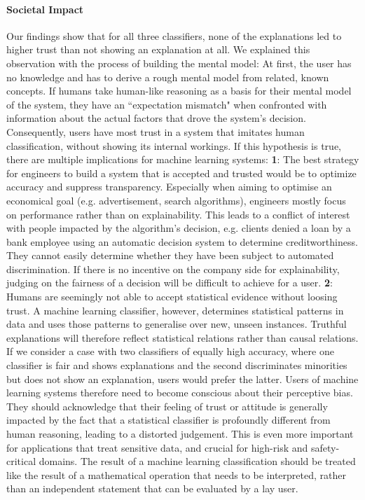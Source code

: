 \paragraph{Societal Impact}
Our findings show that for all three classifiers, none of the explanations led to higher trust than not showing an explanation at all. We explained this observation with the process of building the mental model: At first, the user has no knowledge and has to derive a rough mental model from related, known concepts. If humans take human-like reasoning as a basis for their mental model of the system, they have an ``expectation mismatch" when confronted with information about the actual factors that drove the system's decision. Consequently, users have most trust in a system that imitates human classification, without showing its internal workings.\newline
If this hypothesis is true, there are multiple implications for machine learning systems:\newline
\textbf{1}: The best strategy for engineers to build a system that is accepted and trusted would be to optimize accuracy and suppress transparency. Especially when aiming to optimise an economical goal (e.g. advertisement, search algorithms), engineers mostly focus on performance rather than on explainability. This leads to a conflict of interest with people impacted by the algorithm's decision, e.g. clients denied a loan by a bank employee using an automatic decision system to determine creditworthiness. They cannot easily determine whether they have been subject to automated discrimination. If there is no incentive on the company side for explainability, judging on the fairness of a decision will be difficult to achieve for a user.\newline
\textbf{2}: Humans are seemingly not able to accept statistical evidence without loosing trust. A machine learning classifier, however, determines statistical patterns in data and uses those patterns to generalise over new, unseen instances. Truthful explanations will therefore reflect statistical relations rather than causal relations. If we consider a case with two classifiers of equally high accuracy, where one classifier is fair and shows explanations and the second discriminates minorities but does not show an explanation, users would prefer the latter. Users of machine learning systems therefore need to become conscious about their perceptive bias. They should acknowledge that their feeling of trust or attitude is generally impacted by the fact that a statistical classifier is profoundly different from human reasoning, leading to a distorted judgement. This is even more important for applications that treat sensitive data, and crucial for high-risk and safety-critical domains. The result of a machine learning classification should be treated like the result of a mathematical operation that needs to be interpreted, rather than an independent statement that can be evaluated by a lay user.\newline
